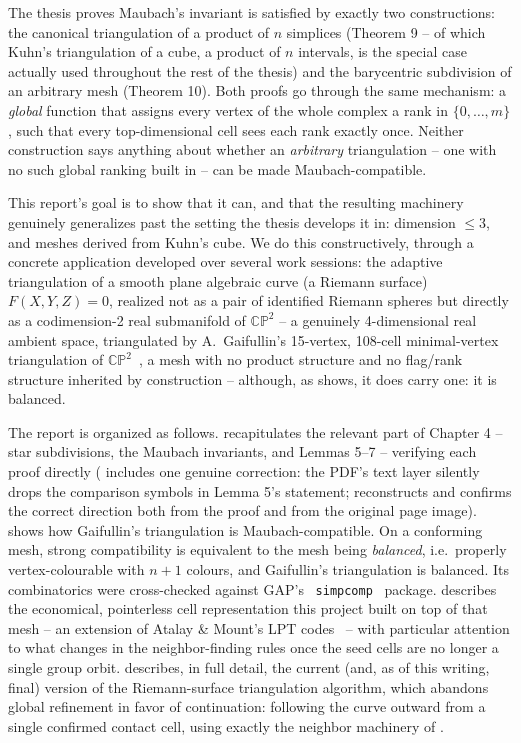 \documentclass[11pt]{article}
\newcommand{\CP}{\mathbb{CP}}
\begin{document}
The thesis proves Maubach's invariant is satisfied by exactly two
constructions: the canonical triangulation of a product of $n$ simplices
(Theorem 9 -- of which Kuhn's triangulation of a cube, a product of $n$
intervals, is the special case actually used throughout the rest of the
thesis) and the barycentric subdivision of an arbitrary mesh (Theorem 10).
Both proofs go through the same mechanism: a \emph{global} function that
assigns every vertex of the whole complex a rank in $\{0,\dots,m\}$, such
that every top-dimensional cell sees each rank exactly once. Neither
construction says anything about whether an \emph{arbitrary} triangulation
-- one with no such global ranking built in -- can be made Maubach-compatible.

This report's goal is to show that it can, and that the resulting
machinery genuinely generalizes past the setting the thesis develops it
in: dimension $\le 3$, and meshes derived from Kuhn's cube. We do this
constructively, through a concrete application developed over several
work sessions: the adaptive triangulation of a smooth plane algebraic
curve (a Riemann surface) $F(X,Y,Z)=0$, realized not as a pair of
identified Riemann spheres but directly as a codimension-2 real
submanifold of $\CP^2$ -- a genuinely 4-dimensional real ambient space,
triangulated by A.~Gaifullin's 15-vertex, 108-cell minimal-vertex
triangulation of $\CP^2$~\cite{gaifullin}, a mesh with no product structure
and no flag/rank structure inherited by construction -- although, as
 shows, it does carry one: it is balanced.

The report is organized as follows.  recapitulates the
relevant part of Chapter 4 -- star subdivisions, the Maubach invariants,
and Lemmas 5--7 -- verifying each proof directly (
includes one genuine correction: the PDF's text layer silently drops the
comparison symbols in Lemma 5's statement;  reconstructs
and confirms the correct direction both from the proof and from the
original page image).  shows how Gaifullin's
triangulation is Maubach-compatible. On a conforming mesh, strong
compatibility is equivalent to the mesh being \emph{balanced}, i.e.\
properly vertex-colourable with $n+1$ colours, and Gaifullin's
triangulation is balanced. Its combinatorics were cross-checked against
GAP's~\cite{gap} \texttt{simpcomp}~\cite{simpcomp} package.  describes the
economical, pointerless cell representation this project built on top of
that mesh -- an extension of Atalay \& Mount's LPT
codes~\cite{atalaymount} -- with particular attention to what changes in
the neighbor-finding rules once the seed cells are no longer a single
group orbit. \Cref{sec:continuation} describes, in full detail, the
current (and, as of this writing, final) version of the Riemann-surface
triangulation algorithm, which abandons global refinement in favor of
continuation: following the curve outward from a single confirmed contact
cell, using exactly the neighbor machinery of \Cref{sec:lpt}.
\end{document}
